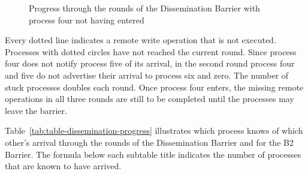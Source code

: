 \documentclass[a4paper, 10pt]{article}
\begin{document}
\begin{figure}[htbp]
	\centering
	
	\caption{Progress through the rounds of the Dissemination Barrier with process four not having entered}
	\label{fig:diagram-dissemination-progress}
\end{figure}

Every dotted line indicates a remote write operation that is not executed. Processes with dotted circles have not reached the current round.
Since process four does not notify process five of its arrival, in the second round process four and five do not advertise their arrival to process six and zero. The number of stuck processes doubles each round.
Once process four enters, the missing remote operations in all three rounds are still to be completed until the processes may leave the barrier.

Table~\ref{tab:table-dissemination-progress} illustrates which process knows of which other's arrival through the rounds of the Dissemination Barrier and for the B2 Barrier. The formula below each subtable title indicates the number of processes that are known to have arrived.
\end{document}
